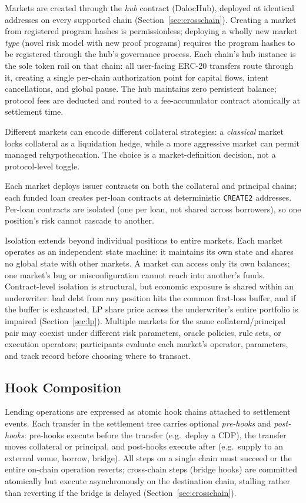 Markets are created through the \emph{hub} contract (DalocHub), deployed at identical addresses on every supported chain (Section~\ref{sec:crosschain}). Creating a market from registered program hashes is permissionless; deploying a wholly new market \emph{type} (novel risk model with new proof programs) requires the program hashes to be registered through the hub's governance process. Each chain's hub instance is the sole token rail on that chain: all user-facing ERC-20 transfers route through it, creating a single per-chain authorization point for capital flows, intent cancellations, and global pause. The hub maintains zero persistent balance; protocol fees are deducted and routed to a fee-accumulator contract atomically at settlement time.

Different markets can encode different collateral strategies: a \emph{classical} market locks collateral as a liquidation hedge, while a more aggressive market can permit managed rehypothecation. The choice is a market-definition decision, not a protocol-level toggle.

Each market deploys issuer contracts on both the collateral and principal chains; each funded loan creates per-loan contracts at deterministic \texttt{CREATE2} addresses. Per-loan contracts are isolated (one per loan, not shared across borrowers), so one position's risk cannot cascade to another.

Isolation extends beyond individual positions to entire markets. Each market operates as an independent state machine: it maintains its own state and shares no global state with other markets. A market can access only its own balances; one market's bug or misconfiguration cannot reach into another's funds. Contract-level isolation is structural, but economic exposure is shared within an underwriter: bad debt from any position hits the common first-loss buffer, and if the buffer is exhausted, LP share price across the underwriter's entire portfolio is impaired (Section~\ref{sec:lp}). Multiple markets for the same collateral/principal pair may coexist under different risk parameters, oracle policies, rule sets, or execution operators; participants evaluate each market's operator, parameters, and track record before choosing where to transact.

\subsection{Hook Composition}

Lending operations are expressed as atomic hook chains attached to settlement events. Each transfer in the settlement tree carries optional \emph{pre-hooks} and \emph{post-hooks}: pre-hooks execute before the transfer (e.g.\ deploy a CDP), the transfer moves collateral or principal, and post-hooks execute after (e.g.\ supply to an external venue, borrow, bridge). All steps on a single chain must succeed or the entire on-chain operation reverts; cross-chain steps (bridge hooks) are committed atomically but execute asynchronously on the destination chain, stalling rather than reverting if the bridge is delayed (Section~\ref{sec:crosschain}).

